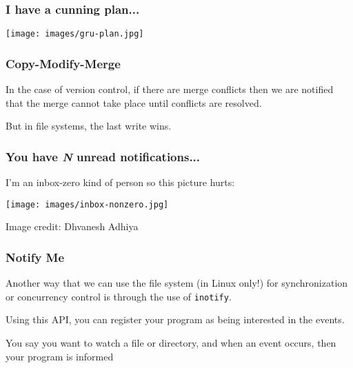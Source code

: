 \begin{frame}
	\frametitle{I have a cunning plan...}

	\begin{center}
		\texttt{[image: images/gru-plan.jpg]}
	\end{center}

\end{frame}



\begin{frame}
	\frametitle{Copy-Modify-Merge}

	In the case of version control, if there are merge conflicts then we are notified that the merge cannot take place until conflicts are resolved.

	But in file systems, the last write wins.

\end{frame}


\begin{frame}
	\frametitle{You have \textit{N} unread notifications...}

	I'm an inbox-zero kind of person so this picture hurts:

	\begin{center}
		\texttt{[image: images/inbox-nonzero.jpg]}
	\end{center}
	{\footnotesize \hfill Image credit: Dhvanesh Adhiya}

\end{frame}


\begin{frame}
	\frametitle{Notify Me}

	Another way that we can use the file system (in Linux only!) for synchronization or concurrency control is through the use of \texttt{inotify}.

	Using this API, you can register your program as being interested in the events.

	You say you want to watch a file or directory, and when an event occurs, then your program is informed

\end{frame}


